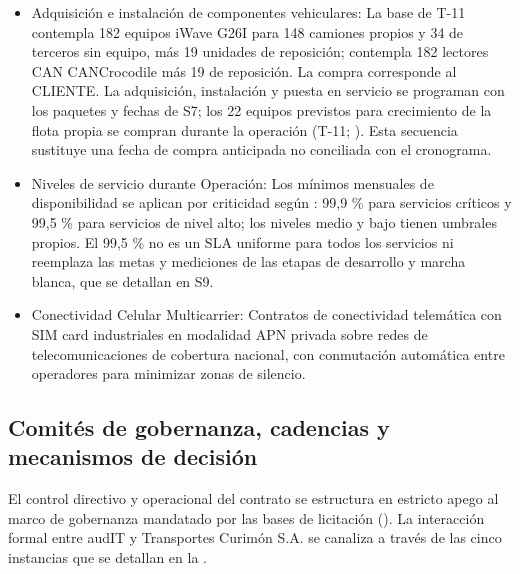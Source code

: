 \begin{itemize}
\item Adquisición e instalación de componentes vehiculares: La base de T-11 contempla 182 equipos iWave G26I para 148 camiones propios y 34 de terceros sin equipo, más 19 unidades de reposición; contempla 182 lectores CAN CANCrocodile más 19 de reposición. La compra corresponde al CLIENTE. La adquisición, instalación y puesta en servicio se programan con los paquetes y fechas de S7; los 22 equipos previstos para crecimiento de la flota propia se compran durante la operación (T-11; ). Esta secuencia sustituye una fecha de compra anticipada no conciliada con el cronograma.
\item Niveles de servicio durante Operación: Los mínimos mensuales de disponibilidad se aplican por criticidad según : 99,9 \% para servicios críticos y 99,5 \% para servicios de nivel alto; los niveles medio y bajo tienen umbrales propios. El 99,5 \% no es un SLA uniforme para todos los servicios ni reemplaza las metas y mediciones de las etapas de desarrollo y marcha blanca, que se detallan en S9.
\item Conectividad Celular Multicarrier: Contratos de conectividad telemática con SIM card industriales en modalidad APN privada sobre redes de telecomunicaciones de cobertura nacional, con conmutación automática entre operadores para minimizar zonas de silencio.
\end{itemize}

\FloatBarrier
\subsection{Comités de gobernanza, cadencias y mecanismos de decisión}\label{sec:6-gestion-ceremonias}\label{sec:06-comites-de-gobernanza-cadencias-y-mecanismos-de-decision}

El control directivo y operacional del contrato se estructura en estricto apego al marco de gobernanza mandatado por las bases de licitación (). La interacción formal entre audIT y Transportes Curimón S.A. se canaliza a través de las cinco instancias que se detallan en la .

